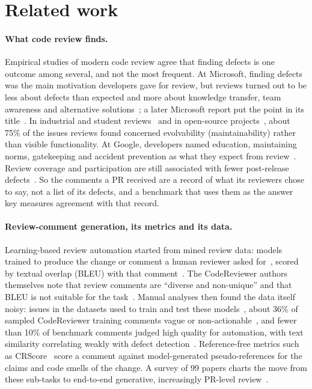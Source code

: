 \documentclass[11pt,a4paper]{article}
\begin{document}
\section{Related work}
\label{sec:related}

\paragraph{What code review finds.} Empirical studies of modern code review
agree that finding defects is one outcome among several, and not the most
frequent. At Microsoft, finding defects was the main motivation developers
gave for review, but reviews turned out to be less about defects than
expected and more about knowledge transfer, team awareness and alternative
solutions~\cite{bacchelli2013}; a later Microsoft report put the point in its
title~\cite{czerwonka2015}. In industrial and student
reviews~\cite{mantyla2009} and in open-source projects~\cite{beller2014},
about 75\% of the issues reviews found concerned evolvability
(maintainability) rather than visible functionality. At Google, developers
named education, maintaining norms, gatekeeping and accident prevention as
what they expect from review~\cite{sadowski2018}. Review coverage and
participation are still associated with fewer post-release
defects~\cite{mcintosh2014}. So the comments a PR received are a record of
what its reviewers chose to say, not a list of its defects, and a benchmark
that uses them as the answer key measures agreement with that record.

\paragraph{Review-comment generation, its metrics and its data.} Learning-based
review automation started from mined review data: models trained to produce
the change or comment a human reviewer asked for~\cite{tufano2022}, scored by
textual overlap (BLEU) with that comment~\cite{codereviewer}. The CodeReviewer
authors themselves note that review comments are ``diverse and non-unique''
and that BLEU is not suitable for the task~\cite{codereviewer}. Manual
analyses then found the data itself noisy: issues in the datasets used to
train and test these models~\cite{tufano2024}, about 36\% of sampled
CodeReviewer training comments vague or non-actionable~\cite{liu2025noisy},
and fewer than 10\% of benchmark comments judged high quality for automation,
with text similarity correlating weakly with defect
detection~\cite{lu2025deepcrceval}. Reference-free metrics such as
CRScore~\cite{crscore} score a comment against model-generated
pseudo-references for the claims and code smells of the change. A survey of 99
papers charts the move from these sub-tasks to end-to-end generative,
increasingly PR-level review~\cite{crsurvey}.
\end{document}
